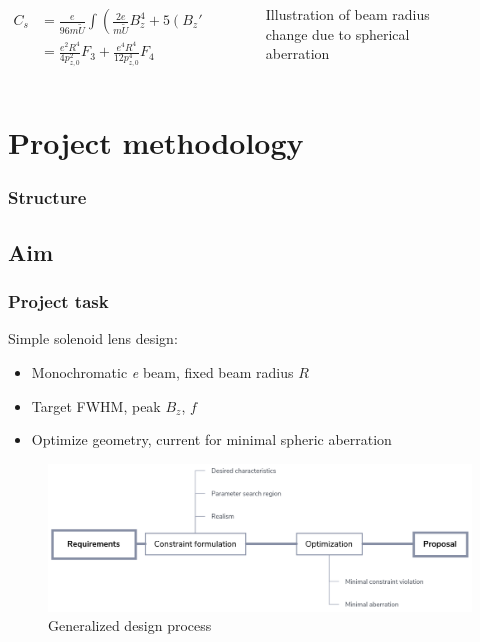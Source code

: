 \documentclass[10pt]{beamer}
\newcommand{\rfn}{\setcounter{footnote}{0}}
\newcommand{\tocslide}{
\begin{frame}
  \frametitle{Structure}
  \tableofcontents[currentsection]
\end{frame}
}
\begin{document}
\begin{frame}
\begin{columns}
\begin{column}{0.6\textwidth}
\begin{figure}[R]
    \end{figure}
    \end{column}
  \end{columns}
  \begin{columns}
    \begin{column}{0.6\textwidth}
    \vspace{-1cm}
    \begin{tiny}

        \begin{align}
          C_{s}&=\frac{e}{96m\tilde{U}}\int\left(\frac{2e}{m\tilde{U}}B_{z}^{4}+5\left(B_{z}'\right)^{2}-B_{z}B_{z}''\right)R^{4}dz \\
          &=\frac{e^{2}R^{4}}{4p_{z,0}^{2}}F_{3}+\frac{e^{4}R^{4}}{12p_{z,0}^{4}}F_{4}
        \end{align}
    \end{tiny}
    \end{column}
    \begin{column}{0.4\textwidth}
      \begin{figure}
      \caption{Illustration of beam radius change due to spherical aberration}
      \end{figure}
      \end{column}
  \end{columns}
  \end{frame}

\section{Project methodology}
\tocslide
\subsection{Aim}
\begin{frame}
  \rfn
  \frametitle{Project task}
  Simple solenoid lens design:
  \begin{itemize}
    \item Monochromatic \textit{e} beam, fixed beam radius $R$
    \item Target FWHM, peak $B_z$, $f$
    \item Optimize geometry, current for minimal spheric aberration
  \end{itemize}
  \begin{figure}
    \includegraphics[width=\textwidth]{blok_cxema}
    \caption{Generalized design process}
  \end{figure}
\end{frame}
\end{document}
